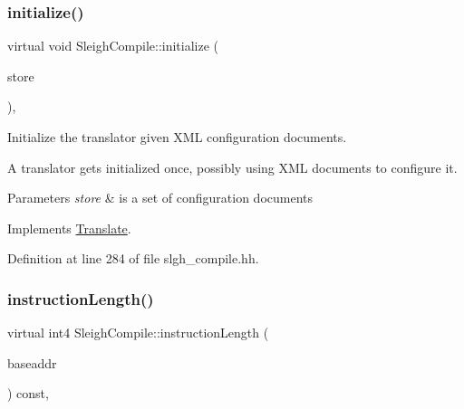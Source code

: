 \mbox{\label{class_sleigh_compile_afbc2737c7b6421eba8b0cca13039270c}} 
\subsubsection{\texorpdfstring{initialize()}{initialize()}}
{\footnotesize\ttfamily virtual void Sleigh\+Compile\+::initialize (\begin{DoxyParamCaption}\item[{\mbox{\hyperlink{class_document_storage}{Document\+Storage}} \&}]{store }\end{DoxyParamCaption})\hspace{0.3cm}{\ttfamily [inline]}, {\ttfamily [virtual]}}



Initialize the translator given X\+ML configuration documents. 

A translator gets initialized once, possibly using X\+ML documents to configure it. 
\begin{DoxyParams}{Parameters}
{\em store} & is a set of configuration documents \\
\hline
\end{DoxyParams}


Implements \mbox{\hyperlink{class_translate_af8e71e9a9477e9a91be400ecca565df5}{Translate}}.



Definition at line 284 of file slgh\+\_\+compile.\+hh.

\mbox{\label{class_sleigh_compile_acec92daa9826ded3fe156d2b58ccc2ca}} 
\subsubsection{\texorpdfstring{instructionLength()}{instructionLength()}}
{\footnotesize\ttfamily virtual int4 Sleigh\+Compile\+::instruction\+Length (\begin{DoxyParamCaption}\item[{const \mbox{\hyperlink{class_address}{Address}} \&}]{baseaddr }\end{DoxyParamCaption}) const\hspace{0.3cm}{\ttfamily [inline]}, {\ttfamily [virtual]}}



